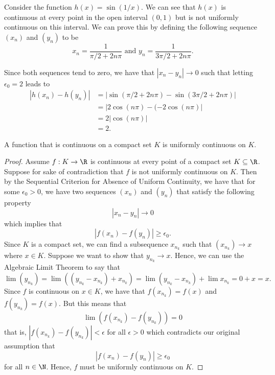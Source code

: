 \begin{ex}
    Consider the function \( h(x) = \sin (1/x) \). We can see that \( h(x) \) is continuous at every point in the open interval \( (0,1) \) but is not uniformly continuous on this interval. We can prove this by defining the following sequence \( (x_n) \) and \( (y_n) \) to be 
    \[  x_n = \frac{ 1 }{ \pi / 2 + 2n \pi } \text{~and~} y_n = \frac{ 1 }{ 3\pi / 2 + 2n \pi }. \]
\end{ex}
Since both sequences tend to zero, we have that \( | x_n - y_n | \to 0  \) such that letting \( \epsilon_0 = 2  \) leads to 
\begin{align*}
    | h(x_n) - h(y_n) | &= | \sin(\pi / 2 + 2n \pi ) - \sin( 3 \pi / 2 + 2n \pi)|  \\
                        &= | 2\cos(n \pi) - (-2\cos(n \pi)  | \\ 
                        &= 2 | \cos(n \pi) | \\  
                        &= 2.
\end{align*}

\begin{tcolorbox}
    \begin{thm}
    A function that is continuous on a compact set \( K  \) is uniformly continuous on \( K \).
    \end{thm}
\end{tcolorbox}

\begin{proof}
Assume \( f: K \to \R  \) is continuous at every point of a compact set \( K \subseteq \R  \). Suppose for sake of contradiction that \( f \) is not uniformly continuous on \( K \). Then by the Sequential Criterion for Absence of Uniform Continuity, we have that for some \( \epsilon_0 > 0  \), we have two sequences \( (x_n) \) and \( (y_n) \) that satisfy the following property 
\[  | x_n - y_n | \to 0  \] which implies that 
\[  | f(x_n) - f(y_n) | \geq \epsilon_0. \]
Since \( K  \) is a compact set, we can find a subsequence \( x_{n_k} \) such that \( (x_{n_k}) \to x  \) where \( x \in K  \). Suppose we want to show that \( y_{n_k} \to x  \). Hence, we can use the Algebraic Limit Theorem to say that 
\[ \lim (y_{n_k}) = \lim ((y_{n_k} - x_{n_k}) + x_{n_k}) = \lim (y_{n_k} - x_{n_k}) + \lim x_{n_k} = 0 + x = x.  \]
Since \( f \) is continuous on \( x \in K  \), we have that \( f(x_{n_k}) = f(x) \) and \( f(y_{n_k}) = f(x) \). But this means that 
\[ \lim (f(x_{n_k}) - f(y_{n_k})) = 0   \]
that is, \( | f(x_{n_k}) - f(y_{n_k})  | < \epsilon \)
for all \( \epsilon > 0  \)
which contradicts our original assumption that 
\[  | f(x_n) - f(y_n) | \geq \epsilon_0 \]
for all \( n \in \N  \). Hence, \( f \) must be uniformly continuous on \( K \).
\end{proof}



